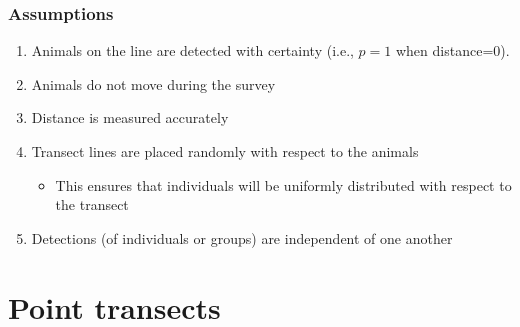 \documentclass[color=usenames,dvipsnames,handout]{beamer}\usepackage[]{graphicx}\usepackage[]{xcolor}
\begin{document}







\begin{frame}
  \frametitle{Assumptions}
  \large
  \begin{enumerate}[<+- | visible@+->][(1)]%
    \item Animals on the line are detected with certainty (i.e., $p=1$ when distance=0).
    \item Animals do not move during the survey
    \item Distance is measured accurately
    \item Transect lines are placed randomly with respect to the animals
      \begin{itemize}
        \large
        \item This ensures that individuals will be uniformly
          distributed with respect to the transect
      \end{itemize}
    \item Detections (of individuals or groups) are independent of one another
  \end{enumerate}
\end{frame}











\section{Point transects}
\end{document}
